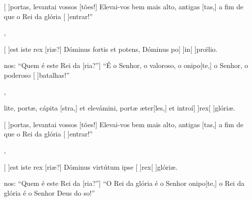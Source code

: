 {    {\item {}[ ]{por}tas, levantai vossos [tões!] Elevai-vos bem mais alto, antigas [tas,] a fim de que o Rei da glória [ ]{en}trar!”~\Antiphona},
  {\item {}[ ]{est} iste rex [riæ?] Dóminus fortis et potens, Dóminus po[ ]{in}[ ]{prœ́}lio.~\Antiphona}%
    {\item {}nos: “Quem é este Rei da [ria?''] “É o Senhor, o valoroso, o onipo[te,] o Senhor, o poderoso [ ]{ba}{ta}lhas!”~\Antiphona},
  {\item {}lite, portæ, cápita [stra,] et elevámini, portæ æter[les,] et introí[ ]{rex}[ ]{gló}riæ.~\Antiphona}%
    {\item {}[ ]{por}tas, levantai vossos [tões!] Elevai-vos bem mais alto, antigas [tas,] a fim de que o Rei da glória [ ]{en}trar!”~\Antiphona},
  {\item {}[ ]{est} iste rex [riæ?] Dóminus virtútum ipse [ ]{rex}[ ]{gló}riæ.~\Antiphona}%
    {\item {}nos: “Quem é este Rei da [ria?''] “O Rei da glória é o Senhor onipo[te,] o Rei da glória é o Senhor Deus do so!”~\Antiphona}
}